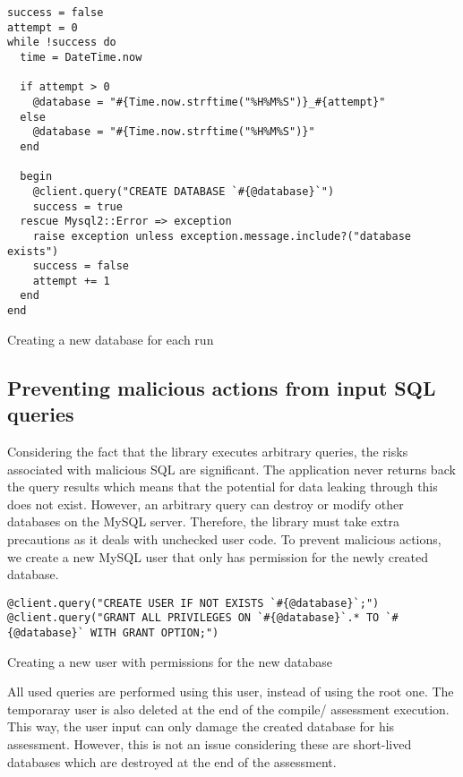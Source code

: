 \begin{listing}
    \centering
    \begin{verbatim}
success = false
attempt = 0
while !success do
  time = DateTime.now

  if attempt > 0
    @database = "#{Time.now.strftime("%H%M%S")}_#{attempt}"
  else
    @database = "#{Time.now.strftime("%H%M%S")}"
  end

  begin
    @client.query("CREATE DATABASE `#{@database}`")
    success = true
  rescue Mysql2::Error => exception
    raise exception unless exception.message.include?("database exists")
    success = false
    attempt += 1
  end
end
\end{verbatim}
    \caption{Creating a new database for each run}
    \label{fig:creating_new_database}
\end{listing}

\subsection{Preventing malicious actions from input SQL queries}

Considering the fact that the library executes arbitrary queries, the risks associated with malicious SQL are significant. The application never returns back the query results which means that the potential for data leaking through this does not exist. However, an arbitrary query can destroy or modify other databases on the MySQL server. Therefore, the library must take extra precautions as it deals with unchecked user code. To prevent malicious actions, we create a new MySQL user that only has permission for the newly created database.
\begin{listing}
    \begin{verbatim}
@client.query("CREATE USER IF NOT EXISTS `#{@database}`;")
@client.query("GRANT ALL PRIVILEGES ON `#{@database}`.* TO `#{@database}` WITH GRANT OPTION;")
    \end{verbatim}
    \caption{Creating a new user with permissions for the new database}
    \label{fig:creating_new_user}
\end{listing}
All used queries are performed using this user, instead of using the root one. The temporaray user is also deleted at the end of the compile/ assessment execution. This way, the user input can only damage the created database for his assessment. However, this is not an issue considering these are short-lived databases which are destroyed at the end of the assessment.


